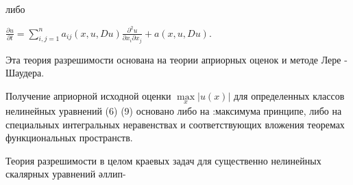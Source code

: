 \documentclass[10pt]{article}
\begin{document}
либо



$\frac{\partial u}{\partial t}=\sum_{i, j=1}^{n} a_{i j}(x, u, D u) \frac{\partial^{2} u}{\partial x_{i} \partial x_{j}}+a(x, u, D u)$.



Эта теория разрешимости основана на теории априорных оценок и методе Лере - Шаудера.



Получение априорной исходной оценки $\underset{x}{\max }|u(x)|$ для определенных классов нелинейных уравнений (6) (9) основано либо на :максимума принципе, либо на специальных интегральных неравенствах и соответствующих вложения теоремах функциональных пространств.



Теория разрешимости в целом краевых задач для существенно нелинейных скалярных уравнений әллип-
\end{document}
